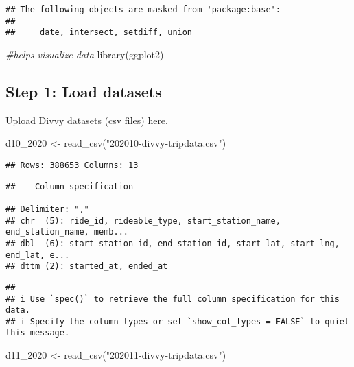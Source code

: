 \documentclass[
]{article}
\newenvironment{Shaded}{\begin{snugshade}}{\end{snugshade}}
\newcommand{\CommentTok}[1]{\textcolor[rgb]{0.56,0.35,0.01}{\textit{#1}}}
\newcommand{\FunctionTok}[1]{\textcolor[rgb]{0.00,0.00,0.00}{#1}}
\newcommand{\NormalTok}[1]{#1}
\newcommand{\OtherTok}[1]{\textcolor[rgb]{0.56,0.35,0.01}{#1}}
\newcommand{\StringTok}[1]{\textcolor[rgb]{0.31,0.60,0.02}{#1}}
\begin{document}
\begin{verbatim}
## The following objects are masked from 'package:base':
## 
##     date, intersect, setdiff, union
\end{verbatim}

\begin{Shaded}
\begin{Highlighting}[]
\CommentTok{\#helps visualize data}
\FunctionTok{library}\NormalTok{(ggplot2)  }
\end{Highlighting}
\end{Shaded}

\hypertarget{step-1-load-datasets}{%
\subsection{Step 1: Load datasets}\label{step-1-load-datasets}}

Upload Divvy datasets (csv files) here.

\begin{Shaded}
\begin{Highlighting}[]
\NormalTok{d10\_2020 }\OtherTok{\textless{}{-}} \FunctionTok{read\_csv}\NormalTok{(}\StringTok{"202010{-}divvy{-}tripdata.csv"}\NormalTok{)}
\end{Highlighting}
\end{Shaded}

\begin{verbatim}
## Rows: 388653 Columns: 13
\end{verbatim}

\begin{verbatim}
## -- Column specification --------------------------------------------------------
## Delimiter: ","
## chr  (5): ride_id, rideable_type, start_station_name, end_station_name, memb...
## dbl  (6): start_station_id, end_station_id, start_lat, start_lng, end_lat, e...
## dttm (2): started_at, ended_at
\end{verbatim}

\begin{verbatim}
## 
## i Use `spec()` to retrieve the full column specification for this data.
## i Specify the column types or set `show_col_types = FALSE` to quiet this message.
\end{verbatim}

\begin{Shaded}
\begin{Highlighting}[]
\NormalTok{d11\_2020 }\OtherTok{\textless{}{-}} \FunctionTok{read\_csv}\NormalTok{(}\StringTok{"202011{-}divvy{-}tripdata.csv"}\NormalTok{)}
\end{Highlighting}
\end{Shaded}
\end{document}
